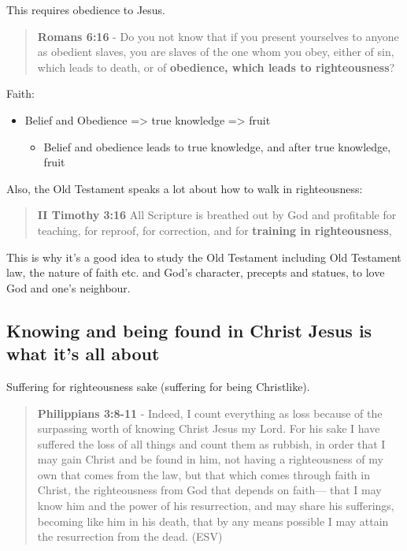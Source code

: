 \documentclass[11pt]{article}
\begin{document}
This requires obedience to Jesus.

\begin{quote}
\textbf{Romans 6:16} - Do you not know that if you present yourselves to anyone as obedient slaves, you are slaves of the one whom you obey, either of sin, which leads to death, or of \textbf{obedience, which leads to righteousness}?
\end{quote}

Faith:
\begin{itemize}
\item Belief and Obedience => true knowledge => fruit
\begin{itemize}
\item Belief and obedience leads to true knowledge, and after true knowledge, fruit
\end{itemize}
\end{itemize}

Also, the Old Testament speaks a lot about how to walk in righteousness:

\begin{quote}
\textbf{II Timothy 3:16} All Scripture is breathed out by God and profitable for teaching, for reproof, for correction, and for \textbf{training in righteousness},
\end{quote}

This is why it's a good idea to study the Old Testament including Old Testament law, the nature of faith etc. and God's character, precepts and statues, to love God and one's neighbour.

\subsection{Knowing and being found in Christ Jesus is what it's all about}
\label{sec:orgff0f2e0}
Suffering for righteousness sake (suffering for being Christlike).

\begin{quote}
\textbf{Philippians 3:8-11} - Indeed, I count everything as loss because of the surpassing worth of knowing Christ Jesus my Lord. For his sake I have suffered the loss of all things and count them as rubbish, in order that I may gain Christ and be found in him, not having a righteousness of my own that comes from the law, but that which comes through faith in Christ, the righteousness from God that depends on faith— that I may know him and the power of his resurrection, and may share his sufferings, becoming like him in his death, that by any means possible I may attain the resurrection from the dead. (ESV)
\end{quote}
\end{document}
